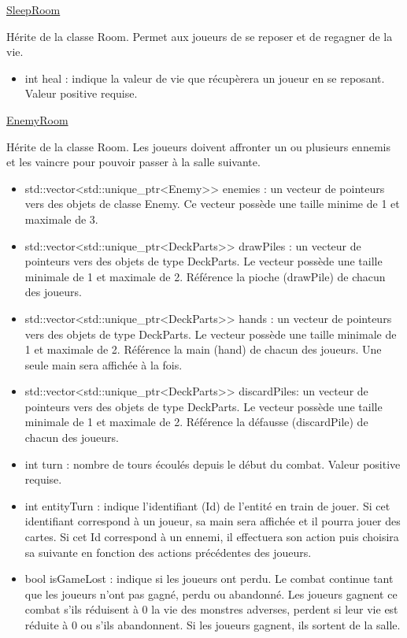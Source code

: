 \underline{SleepRoom}
\par Hérite de la classe Room. Permet aux joueurs de se reposer et de regagner de la vie.
\begin{itemize}
    \item int heal : indique la valeur de vie que récupèrera un joueur en se reposant. Valeur positive requise.
\end{itemize}

\underline{EnemyRoom}
\par Hérite de la classe Room. Les joueurs doivent affronter un ou plusieurs ennemis et les vaincre pour pouvoir passer à la salle suivante.
\begin{itemize}
    \item std::vector<std::unique\_ptr<Enemy>> enemies : un vecteur de pointeurs vers des objets de classe Enemy. Ce vecteur possède une taille minime de 1 et maximale de 3.
    \item std::vector<std::unique\_ptr<DeckParts>> drawPiles : un vecteur de pointeurs vers des objets de type DeckParts. Le vecteur possède une taille minimale de 1 et maximale de 2. Référence la pioche (drawPile) de chacun des joueurs.
    \item std::vector<std::unique\_ptr<DeckParts>> hands : un vecteur de pointeurs vers des objets de type DeckParts. Le vecteur possède une taille minimale de 1 et maximale de 2. Référence la main (hand) de chacun des joueurs. Une seule main sera affichée à la fois.
    \item std::vector<std::unique\_ptr<DeckParts>> discardPiles: un vecteur de pointeurs vers des objets de type DeckParts. Le vecteur possède une taille minimale de 1 et maximale de 2. Référence la défausse (discardPile) de chacun des joueurs.
    \item int turn : nombre de tours écoulés depuis le début du combat. Valeur positive requise. 
    \item int entityTurn : indique l'identifiant (Id) de l'entité en train de jouer. Si cet identifiant correspond à un joueur, sa main sera affichée et il pourra jouer des cartes. Si cet Id correspond à un ennemi, il effectuera son action puis choisira sa suivante en fonction des actions précédentes des joueurs.
    \item bool isGameLost : indique si les joueurs ont perdu. Le combat continue tant que les joueurs n'ont pas gagné, perdu ou abandonné. Les joueurs gagnent ce combat s'ils réduisent à 0 la vie des monstres adverses, perdent si leur vie est réduite à 0 ou s'ils abandonnent. Si les joueurs gagnent, ils sortent de la salle.
    
\end{itemize}


